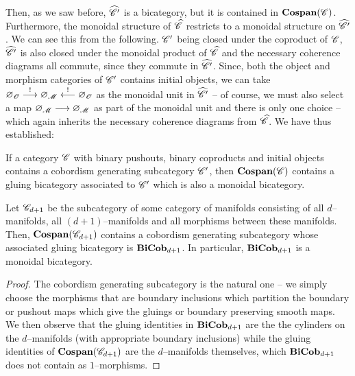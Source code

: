 \documentclass[./Thick_TQFTs_and_Quantum_Information.tex]{subfiles}
\begin{document}
Then, as we saw before, $\wh{\s{C}'}$ is a bicategory, but it is contained in
$\cosp(\s{C})$. Furthermore, the monoidal structure of $\wh{\s{C}}$ restricts to
a monoidal structure on $\wh{\s{C}'}$. We can see this from the following.
$\s{C}'$ being closed under the coproduct of $\s{C}$, $\wh{\s{C}'}$ is also
closed under the monoidal product of $\wh{\s{C}}$ and the necessary coherence
diagrams all commute, since they commute in $\wh{\s{C}'}$. Since, both the
object and morphism categories of $\s{C}'$ contains initial objects, we can take
$\varnothing_{\s{O}} \to[!] \varnothing_{\s{M}} \ot[!] \varnothing_{\s{O}}$ as
the monoidal unit in $\wh{\s{C}'}$ -- of course, we must also select a map
$\varnothing_{\s{M}} \to \varnothing_{\s{M}}$ as part of the monoidal unit and
there is only one choice -- which again inherits the necessary
coherence diagrams from $\wh{\s{C}}$. We have thus established:
\begin{thm}
If a category $\s{C}$ with binary pushouts, binary coproducts and initial
objects contains a cobordism generating subcategory $\s{C}'$, then
$\cosp(\s{C})$ contains a gluing bicategory associated to $\s{C}'$ which is also
a monoidal bicategory.
\end{thm}

\begin{cor}
Let $\s{C}_{d + 1}$ be the subcategory of some category of manifolds consisting
of all $d$--manifolds, all $(d + 1)$--manifolds and all morphisms between these
manifolds. Then, $\cosp(\s{C}_{d + 1})$ contains a cobordism generating
subcategory whose associated gluing bicategory is $\BiCob_{d + 1}$. In
particular, $\BiCob_{d + 1}$ is a monoidal bicategory.
\end{cor}
\begin{proof}
The cobordism generating subcategory is the natural one -- we simply choose the
morphisms that are boundary inclusions which partition the boundary or pushout
maps which give the gluings or boundary preserving smooth maps. We then observe
that the gluing identities in $\BiCob_{d + 1}$ are the the cylinders on the
$d$--manifolds (with appropriate boundary inclusions) while the gluing
identities of $\cosp(\s{C}_{d + 1})$ are the $d$--manifolds themselves, which
$\BiCob_{d + 1}$ does not contain as $1$--morphisms.
\end{proof}
\end{document}
